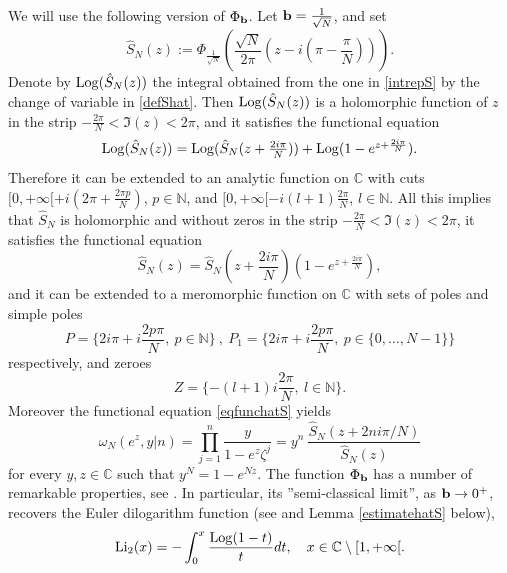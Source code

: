 \documentclass[11pt]{amsart}
\newcommand{\mc}{\mathbb{C}}
\newcommand{\mn}{\mathbb{N}}
\newcommand{\Log}{{\rm Log}}
\newcommand{\rmb}{{\rm \bf b}}
\newcommand{\ra}{\rightarrow}
\begin{document}
{We will use the following version of $\Phi_\rmb$. Let $\textstyle \rmb = \frac{1}{\sqrt{N}}$, and set 
\begin{equation}\label{defShat}
\textstyle \hat{S}_N(z) := \Phi_{\frac{1}{\sqrt{N}}}\left(\frac{\sqrt{N}}{2\pi}\left(z-i(\pi-\frac{\pi}{N})\right)\right).
\end{equation}
Denote by $\Log(\hat{S}_N(z))$ the integral obtained from the one in \eqref{intrepS} by the change of variable in \eqref{defShat}. Then $\Log(\hat{S}_N(z))$ is a holomorphic function of $z$ in the strip $\textstyle -\frac{2\pi}{N}<\mathfrak{I}(z) < 2\pi$, and it satisfies the functional equation
\begin{equation}\label{eqfunchatSLog} 
\textstyle \Log(\hat{S}_N(z)) = \Log(\hat{S}_N(z+\frac{2i\pi}{N})) + \Log(1-e^{z+\frac{2i\pi}{N}}).
\end{equation}
\noindent Therefore it can be extended to an analytic function on $\mc$ with cuts $\textstyle [0,+\infty[+i(2\pi + \frac{2\pi p}{N})$, $p\in\mn$, and $\textstyle [0,+\infty[-i(l+1)\frac{2\pi}{N}$, $l\in\mn$. All this implies that $\hat{S}_N$ is holomorphic and without zeros in the strip $\textstyle -\frac{2\pi}{N}<\mathfrak{I}(z) < 2\pi$, it satisfies the functional equation
\begin{equation}\label{eqfunchatS} 
\textstyle\hat S_{N}(z) = \hat S_{N}(z+\frac{2i\pi}{N})(1-e^{z+\frac{2i\pi}{N}}),
\end{equation}
and it can be extended to a meromorphic function on $\mc$ with sets of poles and simple poles
\begin{equation}\label{PP1}
\textstyle P=\{2i\pi+i\frac{2p\pi}{N},\ p\in \mn\}\ ,\ P_1=\{2i\pi+i\frac{2p\pi}{N},\ p\in \{0,\ldots,N-1\}\}
\end{equation}
respectively, and zeroes
$$\textstyle Z=\{-(l+1)i\frac{2\pi}{N},\ l\in \mn\}.$$
Moreover the functional equation \eqref{eqfunchatS} yields
\begin{equation}\label{relomS0}
\omega_N(e^{z},y| n) = \prod_{j=1}^{n} \frac{y}{1-e^{z}\zeta^j} = y^n\ \frac{\hat S_N(z+2n i\pi/N)}{\hat S_N(z)}
\end{equation}
for every $y,z\in \mc$ such that $y^N = 1-e^{Nz}$. 
The function $\Phi_\rmb$ has a number of remarkable properties, see \cite{FKV,AK}. In particular, its ''semi-classical limit'', as $\rmb \ra 0^+$, recovers the Euler dilogarithm function (see \cite{Z} and Lemma \ref{estimatehatS} below),
\begin{equation}\label{Li2def}{\rm Li_2}(x) = -\int_0^x\frac{\Log(1-t)}{t}dt,\quad x\in \mc\setminus [1,+\infty[.

\end{equation}}
\end{document}
